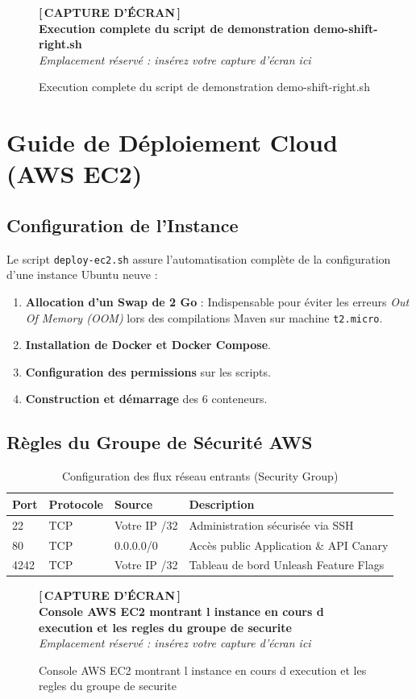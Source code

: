 \documentclass[12pt,a4paper]{article}
\newcommand{\screenshotplaceholder}[2][7cm]{%
  \begin{figure}[H]
    \centering
    \begin{tcolorbox}[
      width=0.95\textwidth,
      height=#1,
      valign=center,
      halign=center,
      colback=lightgray,
      colframe=secondaryblue!70,
      boxrule=1.5pt,
      dashed
    ]
      \centering
      \vspace{0.2cm}
      {\color{secondaryblue}\Huge\textbf{[\,CAPTURE D'ÉCRAN\,]}}\\[0.4cm]
      {\color{darkgray}\large\textbf{#2}}\\[0.2cm]
      {\small\textit{Emplacement réservé : insérez votre capture d'écran ici}}
      \vspace{0.2cm}
    \end{tcolorbox}
    \caption{#2}
    \label{fig:#2}
  \end{figure}
}
\begin{document}
\screenshotplaceholder[7cm]{Execution complete du script de demonstration demo-shift-right.sh}

\section{Guide de Déploiement Cloud (AWS EC2)}

\subsection{Configuration de l'Instance}
Le script \texttt{deploy-ec2.sh} assure l'automatisation complète de la configuration d'une instance Ubuntu neuve :
\begin{enumerate}
    \item \textbf{Allocation d'un Swap de 2 Go} : Indispensable pour éviter les erreurs \textit{Out Of Memory (OOM)} lors des compilations Maven sur machine \texttt{t2.micro}.
    \item \textbf{Installation de Docker et Docker Compose}.
    \item \textbf{Configuration des permissions} sur les scripts.
    \item \textbf{Construction et démarrage} des 6 conteneurs.
\end{enumerate}

\subsection{Règles du Groupe de Sécurité AWS}
\begin{table}[H]
\centering
\caption{Configuration des flux réseau entrants (Security Group)}
\begin{tabular}{llll}
\toprule
\textbf{Port} & \textbf{Protocole} & \textbf{Source} & \textbf{Description} \\
\midrule
22 & TCP & Votre IP /32 & Administration sécurisée via SSH \\
80 & TCP & 0.0.0.0/0 & Accès public Application \& API Canary \\
4242 & TCP & Votre IP /32 & Tableau de bord Unleash Feature Flags \\
\bottomrule
\end{tabular}
\end{table}

\screenshotplaceholder[6cm]{Console AWS EC2 montrant l instance en cours d execution et les regles du groupe de securite}
\end{document}
